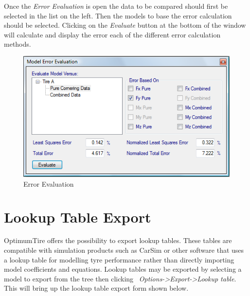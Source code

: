 Once the \textsl{Error Evaluation} is open the data to be compared should first be selected in the list on the left. Then the models to base the error calculation should be selected. Clicking on the \textsl{Evaluate} button at the bottom of the window will calculate and display the error each of the different error calculation methods. 

\begin{figure}[H]
	\centering
		\includegraphics[width=1.0\textwidth]{ErrorEval.png}
	\caption{Error Evaluation}
	\label{fig:ErrorEval}
\end{figure}

\section{Lookup Table Export}
\label{sec:LookupTableExport}
OptimumTire offers the possibility to export lookup tables. These tables are compatible with simulation products such as CarSim or other software that uses a lookup table for modelling tyre performance rather than directly importing model coefficients and equations.
Lookup tables may be exported by selecting a model to export from the tree then clicking ~\textsl{Options->Export->Lookup table}. This will bring up the lookup table export form shown below.

